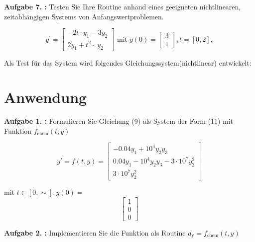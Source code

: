\clearpage


\begin{mybox}
	\textbf{Aufgabe 7. :} Testen Sie Ihre Routine anhand eines geeigneten nichtlinearen, zeitabhängigen Systems von Anfangswertproblemen.
\end{mybox}

\begin{equation}
y^{\prime } =\left\lbrack \begin{array}{c}
	-2t\cdot y_1 -3y_2 \\
	2y_1 +{t^2 \cdot \;y}_2 
\end{array}\right\rbrack \;\mathrm{mit}\;y\left(0\right)=\left\lbrack \begin{array}{c}
	3\\
	1
\end{array}\right\rbrack ,t=\left\lbrack 0,2\right\rbrack ,
\end{equation}

Als Test für das System wird folgendes Gleichungssystem(nichtlinear) entwickelt:



\section{Anwendung}
\begin{mybox}
	\textbf{Aufgabe 1. :} Formulieren Sie Gleichung (9) als System der Form (11) mit Funktion $f_{\mathrm{chem}}(t; y)$
\end{mybox}



\begin{equation}
	y' = f(t,y) = 
\begin{bmatrix}
	-0.04y_1 + 10^4y_2y_3 \\
	0.04y_1-10^4y_2y_3-3\cdot 10^7y^2_2 \\
	3 \cdot 10^7y^2_2 
\end{bmatrix}  
\end{equation}


mit $ t\in [0,\sim], y(0) = $ 
\begin{equation}
\begin{bmatrix}
	1 \\
	0 \\
	0
\end{bmatrix}
\end{equation}
\begin{mybox}
	\textbf{Aufgabe 2. :}  Implementieren Sie die Funktion als Routine $ d_\mathrm{y} = f_{\mathrm{chem}}(t,y) $
\end{mybox}



